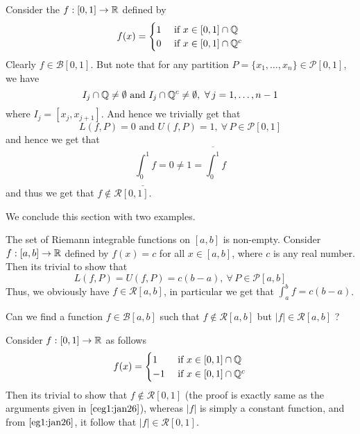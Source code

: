 \begin{cexample}\label{ceg1:jan26}
    Consider the  $f : [0,1] \to \mathbb{R}$ defined by 
    \[ f(x) = \begin{cases} 1 & \mbox{ if } x \in [0,1] \cap \mathbb{Q} \\ 0 & \mbox{ if } x \in [0,1] \cap \mathbb{Q}^c \end{cases} \]
    Clearly $f \in \mathcal{B}[0,1]$. But note that for any partition $P = \{x_1,\dots,x_n\} \in \mathcal{P}[0,1]$, we have \[ I_j \cap \mathbb{Q} \neq \emptyset \mbox{ and } I_j \cap \mathbb{Q}^c \neq \emptyset, \ \forall \, j = 1,\dots,n-1 \] where $I_j = [x_j,x_{j+1}]$. And hence we trivially get that \[ L(f,P) = 0 \mbox{ and } U(f,P) = 1, \ \forall \, P \in \mathcal{P}[0,1] \]
    and hence we get that 
    \[ \underline{\int_0^1} f = 0 \neq 1 = \overline{\int_0^1} f \]
    and thus we get that $f \notin \mathcal{R}[0,1]$.
\end{cexample}
We conclude this section with two examples.
\begin{example}\label{eg1:jan26}
    The set of Riemann integrable functions on $[a,b]$ is non-empty. Consider $ f : [a,b] \to \mathbb{R}$ defined by $f(x) = c$ for all $x \in [a,b]$, where $c$ is any real number. Then its trivial to show that \[ L(f,P) = U(f,P) = c(b-a), \ \forall \, P \in \mathcal{P}[a,b] \]
    Thus, we obviously have $f \in \mathcal{R}[a,b]$, in particular we get that $ \int_a^b f = c(b-a) $.
\end{example}

\begin{example}\label{eg2:jan26}
    Can we find a function $f \in \mathcal{B}[a,b]$ such that $f \notin \mathcal{R}[a,b]$ but $|f| \in \mathcal{R}[a,b]$ ?

    Consider $f : [0,1] \to \mathbb{R}$ as follows \[ f(x) = \begin{cases}
        1 & \mbox{ if } x \in [0,1] \cap \mathbb{Q} \\ -1 & \mbox{ if } x \in [0,1] \cap \mathbb{Q}^c
    \end{cases} \]
    Then its trivial to show that $f \notin \mathcal{R}[0,1]$ (the proof is exactly same as the arguments given in  $\ref{ceg1:jan26}$), whereas $|f|$ is simply a constant function, and from  $\ref{eg1:jan26}$, it follow that $|f| \in \mathcal{R}[0,1]$.
\end{example}